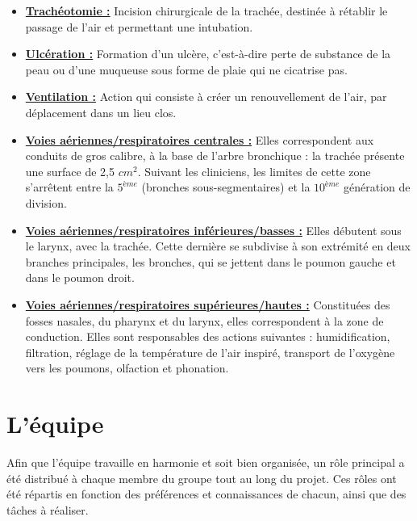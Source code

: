 \documentclass [11pt]{article}
\begin{document}
\begin{itemize}
\item 
\textbf{\underline{Trachéotomie :}}  Incision chirurgicale de la trachée, destinée à rétablir le passage de l'air et permettant une intubation.

\item 
\textbf{\underline{Ulcération :}} Formation d'un ulcère, c'est-à-dire perte de substance de la peau ou d'une muqueuse sous forme de plaie qui ne cicatrise pas.

\item 
\textbf{\underline{Ventilation :}} Action qui consiste à créer un renouvellement de l'air, par déplacement dans un lieu clos.

\item 
\textbf{\underline{Voies aériennes/respiratoires centrales :}} Elles correspondent aux conduits de gros calibre, à la base de l'arbre bronchique : la trachée présente une surface de 2,5 $cm^{2}$. Suivant les cliniciens, les limites de cette zone s'arrêtent entre la $5^{ème}$ (bronches sous-segmentaires) et la $10^{ème}$ génération de division.

\item 
\textbf{\underline{Voies aériennes/respiratoires inférieures/basses :}} Elles débutent sous le larynx, avec la trachée. Cette dernière se subdivise à son extrémité en deux branches principales, les bronches, qui se jettent dans le poumon gauche et dans le poumon droit.


\item 
\textbf{\underline{Voies aériennes/respiratoires supérieures/hautes :}} Constituées des fosses nasales, du pharynx et du larynx, elles correspondent à la zone de conduction. Elles sont responsables des actions suivantes : humidification, filtration, réglage de la température de l'air inspiré, transport de l'oxygène vers les poumons, olfaction et phonation.

\end{itemize}

\newpage

\section{L'équipe}
\par Afin que l'équipe travaille en harmonie et soit bien organisée, un rôle principal a été distribué à chaque membre du groupe tout au long du projet. Ces rôles ont été répartis en fonction des préférences et connaissances de chacun, ainsi que des tâches à réaliser. 
\end{document}
